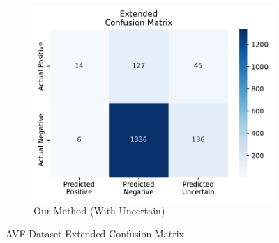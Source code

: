 \documentclass{ieeeaccess}
\begin{document}
\begin{figure}[H]
\begin{subfigure}[b]{0.32\textwidth}
        \label{fig:pta-symptom-method1}
    \end{subfigure}
    \hfill
    \begin{subfigure}[b]{0.32\textwidth}
        \centering
        \includegraphics[width=\linewidth]{new_with_AVF.pdf}
        \caption{Our Method (With Uncertain)}
        \label{fig:pta-symptom-method2}
    \end{subfigure}

    \caption{AVF Dataset Extended Confusion Matrix}
    \label{fig:AVF_ECM}
\end{figure}
\end{document}
